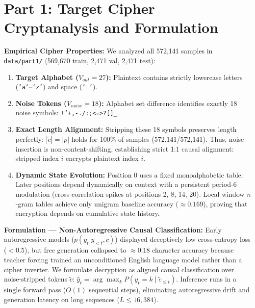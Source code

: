 \documentclass[12pt,a4paper]{article}
\begin{document}
\section{Part 1: Target Cipher Cryptanalysis and Formulation}
\textbf{Empirical Cipher Properties:} We analyzed all 572,141 samples in \texttt{data/part1/} (569,670 train, 2,471 val, 2,471 test):
\begin{enumerate}[leftmargin=*]
    \item \textbf{Target Alphabet ($V_{out} = 27$):} Plaintext contains strictly lowercase letters (\texttt{'a'}--\texttt{'z'}) and space (\texttt{' '}).
    \item \textbf{Noise Tokens ($V_{noise} = 18$):} Alphabet set difference identifies exactly 18 noise symbols: \texttt{!'+,-./:;<=>?[]_{}}.
    \item \textbf{Exact Length Alignment:} Stripping these 18 symbols preserves length perfectly: $|\tilde{c}| = |p|$ holds for 100\% of samples (572,141/572,141). Thus, noise insertion is non-content-shifting, establishing strict 1:1 causal alignment: stripped index $i$ encrypts plaintext index $i$.
    \item \textbf{Dynamic State Evolution:} Position 0 uses a fixed monoalphabetic table. Later positions depend dynamically on context with a persistent period-6 modulation (cross-correlation spikes at positions 2, 8, 14, 20). Local window $n$-gram tables achieve only unigram baseline accuracy ($\approx 0.169$), proving that encryption depends on cumulative state history.
\end{enumerate}

\noindent\textbf{Formulation --- Non-Autoregressive Causal Classification:} Early autoregressive models ($p(y_t | y_{<t}, c)$) displayed deceptively low cross-entropy loss ($<0.5$), but free generation collapsed to $\approx 0.18$ character accuracy because teacher forcing trained an unconditioned English language model rather than a cipher inverter. We formulate decryption as aligned causal classification over noise-stripped tokens $\tilde{c}$: $\hat{y}_t = \arg\max_k P(y_t = k \mid \tilde{c}_{\le t})$. Inference runs in a single forward pass ($O(1)$ sequential steps), eliminating autoregressive drift and generation latency on long sequences ($L \le 16,384$).
\end{document}
